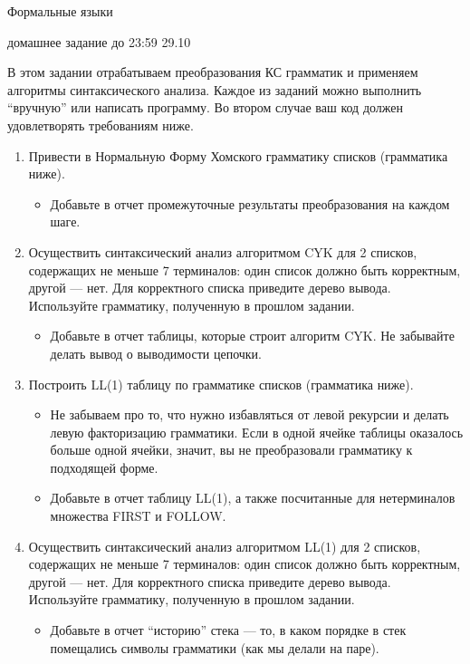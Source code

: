 \documentclass[12pt]{article}
\begin{document}
\begin{center}
{\LARGE Формальные языки}


{\Large домашнее задание до 23:59 29.10}
\end{center}

\bigskip

В этом задании отрабатываем преобразования КС грамматик и применяем алгоритмы синтаксического анализа. Каждое из заданий можно выполнить ``вручную'' или написать программу. Во втором случае ваш код должен удовлетворять требованиям ниже. 

\begin{enumerate}
  \item 
  {
    Привести в Нормальную Форму Хомского грамматику списков (грамматика ниже).
    \begin{itemize}
      \item Добавьте в отчет промежуточные результаты преобразования на каждом шаге. 
    \end{itemize}
  }
  \item 
  {  
    Осуществить синтаксический анализ алгоритмом CYK для 2 списков, содержащих не меньше 7 терминалов: один список должно быть корректным, другой --- нет. Для корректного списка приведите дерево вывода. Используйте грамматику, полученную в прошлом задании.
    \begin{itemize}
      \item Добавьте в отчет таблицы, которые строит алгоритм CYK. Не забывайте делать вывод о выводимости цепочки. 
    \end{itemize}
  }
  \item 
  { 
    Построить LL(1) таблицу по грамматике списков (грамматика ниже). 
    \begin{itemize}
      \item Не забываем про то, что нужно избавляться от левой рекурсии и делать левую факторизацию грамматики. Если в одной ячейке таблицы оказалось больше одной ячейки, значит, вы не преобразовали грамматику к подходящей форме.
      \item Добавьте в отчет таблицу LL(1), а также посчитанные для нетерминалов множества FIRST и FOLLOW. 
    \end{itemize}
  }
  \item
  {
    Осуществить синтаксический анализ алгоритмом LL(1) для 2 списков, содержащих не меньше 7 терминалов: один список должно быть корректным, другой --- нет. Для корректного списка приведите дерево вывода. Используйте грамматику, полученную в прошлом задании. 
    \begin{itemize}
      \item Добавьте в отчет ``историю'' стека --- то, в каком порядке в стек помещались символы грамматики (как мы делали на паре). 
    \end{itemize}
  }
\end{enumerate}
\end{document}
